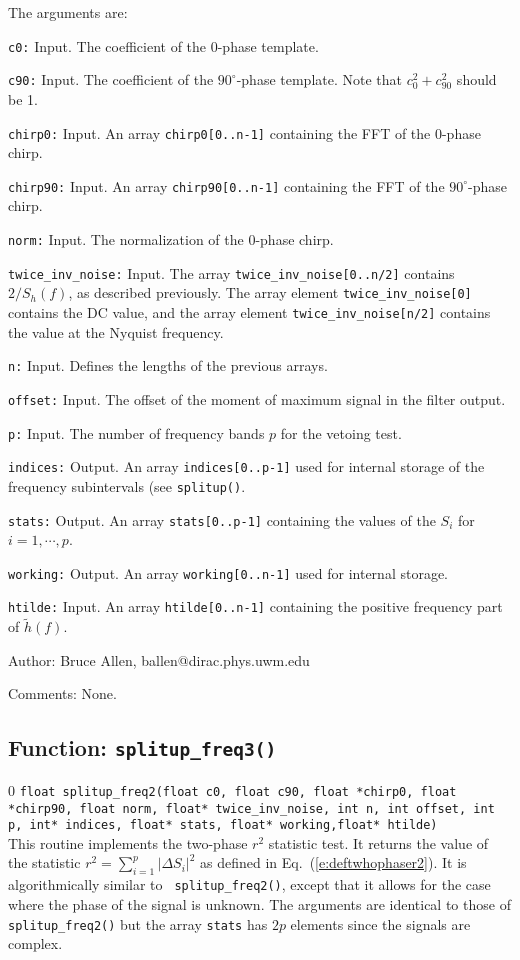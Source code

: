 The arguments are:
\begin{description}
\item{\tt c0:} Input.  The coefficient of the 0-phase template.
\item{\tt c90:} Input.  The coefficient of the $90^\circ$-phase template.  Note that
    $c_0^2 + c_{90}^2$ should be 1.
\item{\tt chirp0:} Input.  An array {\tt chirp0[0..n-1]} containing the FFT of the 0-phase chirp.
\item{\tt chirp90:} Input.  An array {\tt chirp90[0..n-1]}
containing the FFT of the $90^\circ$-phase chirp.
\item{\tt norm:} Input.  The normalization of the 0-phase chirp.
\item{\tt twice\_inv\_noise:} Input.  The array {\tt twice\_inv\_noise[0..n/2]} contains $2/S_h(f)$,
   as described previously.
The array element {\tt twice\_inv\_noise[0]} contains
   the DC value, and the array element {\tt twice\_inv\_noise[n/2]}
   contains the value at the Nyquist frequency.
\item{\tt n:} Input.  Defines the lengths of the previous arrays.
\item{\tt offset:} Input.  The offset of the moment of maximum signal in the filter output.
\item{\tt p:} Input.  The number of frequency bands $p$ for the vetoing test.
\item{\tt indices:} Output.  An array {\tt indices[0..p-1]} used for internal storage of the
   frequency subintervals (see {\tt splitup()}.
\item{\tt stats:} Output.  An array {\tt stats[0..p-1]} containing the values of the $S_i$ for $i=1,\cdots,p$.
\item{\tt working:} Output.  An array {\tt working[0..n-1]} used for internal storage.
\item{\tt htilde:} Input.  An array {\tt htilde[0..n-1]} containing the positive frequency part of
  $\tilde h(f)$.
\end{description}
\begin{description}
\item{Author:}
Bruce Allen, ballen@dirac.phys.uwm.edu
\item{Comments:}
None.
\end{description}
\clearpage


\subsection{Function: {\tt splitup\_freq3()}}
\setcounter{equation}0
{\tt float splitup\_freq2(float c0, float c90, float *chirp0, float
*chirp90, float norm, float* twice\_inv\_noise, int n, int offset, int p,
int* indices, float* stats, float* working,float* htilde)}\\
This routine implements the two-phase $r^2$ statistic test.  It returns
the value of the statistic $r^2=\sum_{i=1}^p |\Delta S_i|^2$ as defined
in Eq.~(\ref{e:deftwhophaser2}).  It is algorithmically similar to {\tt
splitup\_freq2()},  except that it allows for the case where the phase
of the signal is unknown.  The arguments are identical to those of {\tt
splitup\_freq2()} but the array {\tt stats} has $2p$ elements since the
signals are complex.

